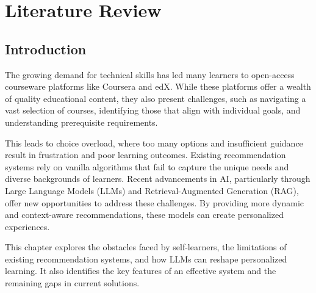 \chapter{Literature Review} \label{chap:chap-2}




    


\section{Introduction}
The growing demand for technical skills has led many learners to open-access courseware platforms like Coursera and edX. While these platforms offer a wealth of quality educational content, they also present challenges, such as navigating a vast selection of courses, identifying those that align with individual goals, and understanding prerequisite requirements. 

This leads to choice overload, where too many options and insufficient guidance result in frustration and poor learning outcomes. Existing recommendation systems rely on vanilla algorithms that fail to capture the unique needs and diverse backgrounds of learners. Recent advancements in AI, particularly through Large Language Models (LLMs) and Retrieval-Augmented Generation (RAG), offer new opportunities to address these challenges. By providing more dynamic and context-aware recommendations, these models can create personalized experiences. 

This chapter explores the obstacles faced by self-learners, the limitations of existing recommendation systems, and how LLMs can reshape personalized learning. It also identifies the key features of an effective system and the remaining gaps in current solutions.

